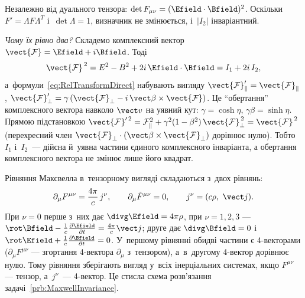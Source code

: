 \begin{Extra}
Незалежно від дуального тензора: $\det F_{\mu\nu} = (\Efield\cdot\Bfield)^2$. Оскільки $F'
= \Lambda F\Lambda^{T}$ і~$\det\Lambda = 1$, визначник не змінюється, і~$|I_2|$
інваріантний.

\emph{Чому їх рівно два?} Складемо комплексний вектор $\vect{\mathcal F} = \Efield +
i\Bfield$. Тоді
\begin{equation*}
	\vect{\mathcal F}^{\,2} = E^2 - B^2 + 2i\,\Efield\cdot\Bfield = I_1 + 2i\,I_2,
\end{equation*}
а~формули~\eqref{eq:RelTransformDirect} набувають вигляду $\vect{\mathcal F}'_\parallel =
\vect{\mathcal F}_\parallel$, $\vect{\mathcal F}'_\perp = \gamma\left(\vect{\mathcal
F}_\perp - i\,\vect\beta\times\vect{\mathcal F}\right)$. Це \enquote{обертання} комплексного
вектора навколо $\vect v$ на уявний кут: $\gamma = \cosh\eta$, $\gamma\beta = \sinh\eta$.
Прямою підстановкою $\vect{\mathcal F}'^{\,2} = \mathcal F_\parallel^2 +
\gamma^2(1-\beta^2)\,\vect{\mathcal F}_\perp^{\,2} = \vect{\mathcal F}^{\,2}$ (перехресний
член $\vect{\mathcal F}_\perp\cdot(\vect\beta\times\vect{\mathcal F}_\perp)$ дорівнює
нулю). Тобто $I_1$ і~$I_2$~--- дійсна й~уявна частини єдиного комплексного інваріанта, а
обертання комплексного вектора не змінює лише його квадрат.

	Рівняння Максвелла в~тензорному вигляді складаються з~двох рівнянь:
	\begin{equation*}
		\partial_\mu F^{\mu\nu} = \frac{4\pi}{c}\,j^\nu, \qquad \partial_\mu\tilde{F}^{\mu\nu} = 0, 
		\qquad j^\nu = (c\rho,\ \vect j).
	\end{equation*}
	При $\nu = 0$ перше з~них дає $\divg\Efield = 4\pi\rho$, при $\nu = 1,2,3$ ---
	$\rot\Bfield - \frac1c\frac{\partial\Efield}{\partial t} = \frac{4\pi}{c}\vect j$;
	друге дає $\divg\Bfield = 0$ і~$\rot\Efield + \frac1c\frac{\partial\Bfield}{\partial
	t} = 0$. У~першому рівнянні обидві частини є 4-векторами ($\partial_\mu F^{\mu\nu}$
	--- згортання 4-вектора $\partial_\mu$ з~тензором), а~в~другому 4-вектор дорівнює
	нулю. Тому рівняння зберігають вигляд у~всіх інерціальних системах, якщо $F^{\mu\nu}$
	--- тензор, а~$j^\nu$~--- 4-вектор. Це стисла схема розв'язання
	задачі~\ref{prb:MaxwellInvariance}.
\end{Extra}

